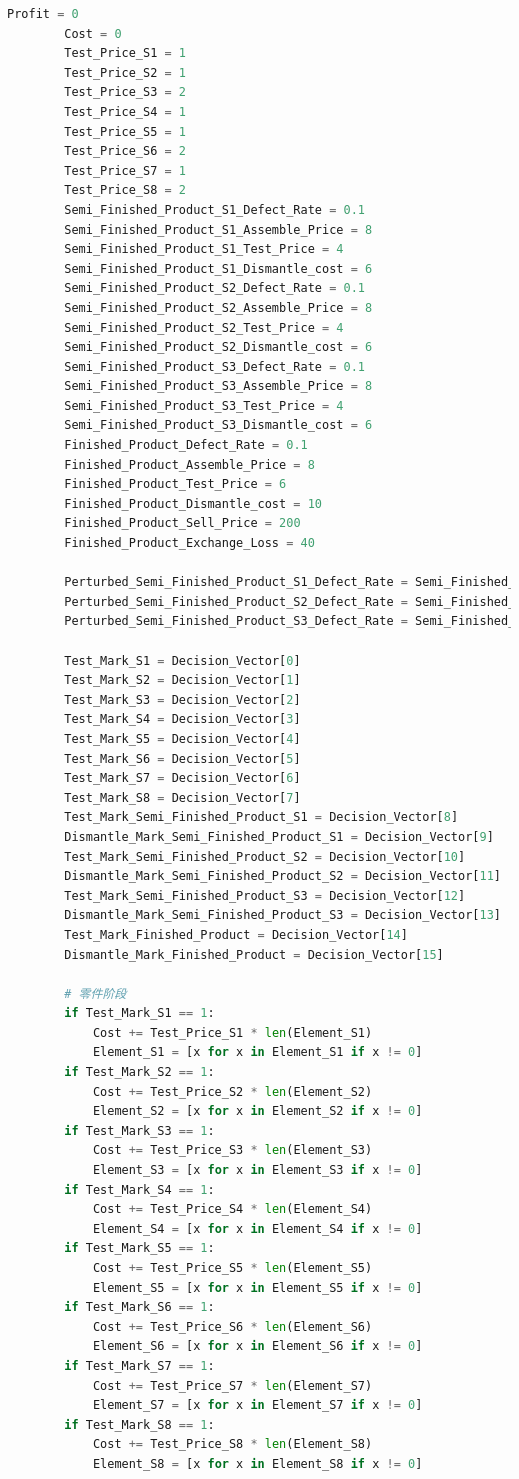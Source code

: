 \documentclass[withoutpreface,bwprint]{cumcmthesis} %
\begin{document}
\begin{appendices}
\begin{lstlisting}[language=python]
		Profit = 0
		Cost = 0
		Test_Price_S1 = 1
		Test_Price_S2 = 1
		Test_Price_S3 = 2
		Test_Price_S4 = 1
		Test_Price_S5 = 1
		Test_Price_S6 = 2
		Test_Price_S7 = 1
		Test_Price_S8 = 2
		Semi_Finished_Product_S1_Defect_Rate = 0.1
		Semi_Finished_Product_S1_Assemble_Price = 8
		Semi_Finished_Product_S1_Test_Price = 4
		Semi_Finished_Product_S1_Dismantle_cost = 6
		Semi_Finished_Product_S2_Defect_Rate = 0.1
		Semi_Finished_Product_S2_Assemble_Price = 8
		Semi_Finished_Product_S2_Test_Price = 4
		Semi_Finished_Product_S2_Dismantle_cost = 6
		Semi_Finished_Product_S3_Defect_Rate = 0.1
		Semi_Finished_Product_S3_Assemble_Price = 8
		Semi_Finished_Product_S3_Test_Price = 4
		Semi_Finished_Product_S3_Dismantle_cost = 6
		Finished_Product_Defect_Rate = 0.1
		Finished_Product_Assemble_Price = 8
		Finished_Product_Test_Price = 6
		Finished_Product_Dismantle_cost = 10
		Finished_Product_Sell_Price = 200
		Finished_Product_Exchange_Loss = 40
	
		Perturbed_Semi_Finished_Product_S1_Defect_Rate = Semi_Finished_Product_S1_Defect_Rate + np.random.normal(0, 0.01)
		Perturbed_Semi_Finished_Product_S2_Defect_Rate = Semi_Finished_Product_S2_Defect_Rate + np.random.normal(0, 0.01)
		Perturbed_Semi_Finished_Product_S3_Defect_Rate = Semi_Finished_Product_S3_Defect_Rate + np.random.normal(0, 0.01)
	
		Test_Mark_S1 = Decision_Vector[0]
		Test_Mark_S2 = Decision_Vector[1]
		Test_Mark_S3 = Decision_Vector[2]
		Test_Mark_S4 = Decision_Vector[3]
		Test_Mark_S5 = Decision_Vector[4]
		Test_Mark_S6 = Decision_Vector[5]
		Test_Mark_S7 = Decision_Vector[6]
		Test_Mark_S8 = Decision_Vector[7]
		Test_Mark_Semi_Finished_Product_S1 = Decision_Vector[8]
		Dismantle_Mark_Semi_Finished_Product_S1 = Decision_Vector[9]
		Test_Mark_Semi_Finished_Product_S2 = Decision_Vector[10]
		Dismantle_Mark_Semi_Finished_Product_S2 = Decision_Vector[11]
		Test_Mark_Semi_Finished_Product_S3 = Decision_Vector[12]
		Dismantle_Mark_Semi_Finished_Product_S3 = Decision_Vector[13]
		Test_Mark_Finished_Product = Decision_Vector[14]
		Dismantle_Mark_Finished_Product = Decision_Vector[15]
	
		# 零件阶段
		if Test_Mark_S1 == 1:
			Cost += Test_Price_S1 * len(Element_S1)
			Element_S1 = [x for x in Element_S1 if x != 0]
		if Test_Mark_S2 == 1:
			Cost += Test_Price_S2 * len(Element_S2)
			Element_S2 = [x for x in Element_S2 if x != 0]
		if Test_Mark_S3 == 1:
			Cost += Test_Price_S3 * len(Element_S3)
			Element_S3 = [x for x in Element_S3 if x != 0]
		if Test_Mark_S4 == 1:
			Cost += Test_Price_S4 * len(Element_S4)
			Element_S4 = [x for x in Element_S4 if x != 0]
		if Test_Mark_S5 == 1:
			Cost += Test_Price_S5 * len(Element_S5)
			Element_S5 = [x for x in Element_S5 if x != 0]
		if Test_Mark_S6 == 1:
			Cost += Test_Price_S6 * len(Element_S6)
			Element_S6 = [x for x in Element_S6 if x != 0]
		if Test_Mark_S7 == 1:
			Cost += Test_Price_S7 * len(Element_S7)
			Element_S7 = [x for x in Element_S7 if x != 0]
		if Test_Mark_S8 == 1:
			Cost += Test_Price_S8 * len(Element_S8)
			Element_S8 = [x for x in Element_S8 if x != 0]
	

\end{lstlisting}
\end{appendices}
\end{document}
